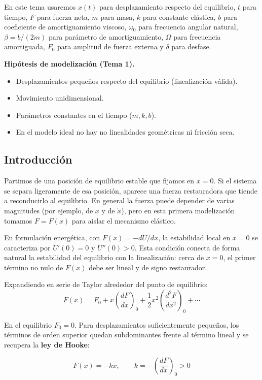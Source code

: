 \documentclass[12pt, a4paper]{article}
\theoremstyle{plain}
\theoremstyle{definition}
\theoremstyle{remark}
\begin{document}
En este tema usaremos $x(t)$ para desplazamiento respecto del equilibrio, $t$ para tiempo,
$F$ para fuerza neta, $m$ para masa, $k$ para constante elástica, $b$ para coeficiente de
amortiguamiento viscoso, $\omega_0$ para frecuencia angular natural, $\beta=b/(2m)$ para
parámetro de amortiguamiento, $\Omega$ para frecuencia amortiguada, $F_0$ para amplitud de
fuerza externa y $\delta$ para desfase.

\begin{mdframed}[style=resultado]
\textbf{Hipótesis de modelización (Tema 1).}
\begin{itemize}
  \item Desplazamientos pequeños respecto del equilibrio (linealización válida).
  \item Movimiento unidimensional.
  \item Parámetros constantes en el tiempo ($m,k,b$).
  \item En el modelo ideal no hay no linealidades geométricas ni fricción seca.
\end{itemize}
\end{mdframed}

\subsection{Introducción}

Partimos de una posición de equilibrio estable que fijamos en $x=0$. Si el sistema se
separa ligeramente de esa posición, aparece una fuerza restauradora que tiende a
reconducirlo al equilibrio. En general la fuerza puede depender de varias magnitudes
(por ejemplo, de $x$ y de $\dot x$), pero en esta primera modelización tomamos
$F=F(x)$ para aislar el mecanismo elástico.

En formulación energética, con $F(x)=-dU/dx$, la estabilidad local en $x=0$ se caracteriza
por $U'(0)=0$ y $U''(0)>0$. Esta condición conecta de forma natural la estabilidad del
equilibrio con la linealización: cerca de $x=0$, el primer término no nulo de $F(x)$ debe
ser lineal y de signo restaurador.

Expandiendo en serie de Taylor alrededor del punto de equilibrio:
\begin{equation}
  F(x) = F_0 + x\!\left(\frac{dF}{dx}\right)_{\!0}
         + \frac{1}{2}x^2\!\left(\frac{d^2F}{dx^2}\right)_{\!0} + \cdots
\end{equation}

En el equilibrio $F_0=0$. Para desplazamientos suficientemente pequeños, los términos de
orden superior quedan subdominantes frente al término lineal y se recupera la
\textbf{ley de Hooke}:
\begin{mdframed}[style=resultado]
\begin{equation}
  F(x) = -kx, \qquad k = -\!\left(\frac{dF}{dx}\right)_{\!0} > 0
\end{equation}
\end{mdframed}
\end{document}
